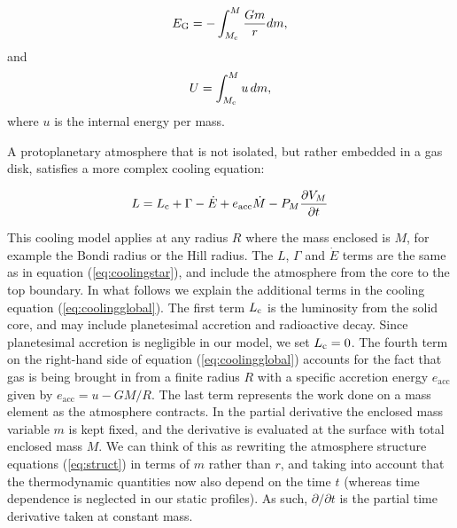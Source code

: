 \documentclass[apj]{emulateapj}
\newcommand{\co}{_{\rm c}}
\begin{document}
\begin{equation}
\label{eq:Eg}
E_{\rm G}=-\int_{M\co}^M \frac{G m}{r} dm,
\end{equation}
and
\begin{equation}
\label{eq:U}
U=\int_{M\co}^M u\, dm,
\end{equation}
where $u$ is the internal energy per mass.

A protoplanetary atmosphere that is not isolated, but rather embedded in a gas disk, satisfies a more complex cooling equation:

\begin{equation}
\label{eq:coolingglobal}
L=L\co+\Gamma-\dot{E}+e_{\mathrm{acc}}\dot{M}-P_M \frac{\partial V_M}{\partial t}
\end{equation}

This cooling model applies at any radius $R$ where the mass enclosed is $M$, for example the Bondi radius or the Hill radius. The $L$, $\Gamma$ and $\dot{E}$ terms are the same as in equation (\ref{eq:coolingstar}), and include the atmosphere from the core to the top boundary. In what follows we explain the additional terms in the cooling equation (\ref{eq:coolingglobal}). The first term $L\co$ is the luminosity from the solid core, and may include planetesimal accretion and radioactive decay. Since planetesimal accretion is negligible in our model, we set $L\co=0$. The fourth term on the right-hand side of equation (\ref{eq:coolingglobal}) accounts for the fact that gas is being brought in from a finite radius $R$ with a specific accretion energy $e_{\mathrm{acc}}$ given by $e_{\mathrm{acc}}=u-G M/R$. The last term represents the work done on a mass element as the atmosphere contracts. In the partial derivative the enclosed mass variable $m$ is kept fixed, and the derivative is evaluated at the surface with total enclosed mass $M$. We can think of this as rewriting the atmosphere structure equations (\ref{eq:struct}) in terms of $m$ rather than $r$, and taking into account that the thermodynamic quantities now also depend on the time $t$ (whereas time dependence is neglected in our static profiles). As such, $\partial / \partial t$ is the partial time derivative taken at constant mass. 


\end{document}
